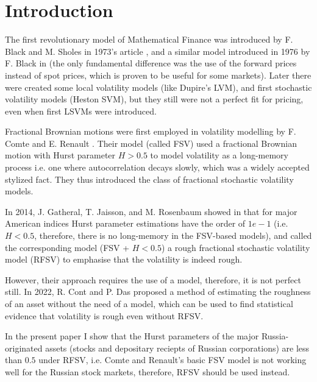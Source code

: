 \section{Introduction}
    The first revolutionary model of Mathematical Finance was introduced by F. Black and
    M. Sholes in 1973's article \cite{BlackSholes1973}, and a similar model introduced in
    1976 by F. Black in \cite{Black1976} (the only fundamental difference was the use of 
    the forward prices instead of spot prices, which is proven to be useful for some markets). 
    Later there were created some local volatility models (like Dupire's LVM), and first 
    stochastic volatility models (Heston SVM), but they still were not a perfect fit for pricing, 
    even when first LSVMs were introduced.

    Fractional Brownian motions were first employed in volatility modelling by F. Comte and 
    E. Renault \cite{ComteRenault1998}. Their model (called FSV) used a fractional Brownian 
    motion with Hurst parameter $H > 0.5$ to model volatility as a long-memory process i.e. 
    one where autocorrelation decays slowly, which was a widely accepted stylized fact. They 
    thus introduced the class of fractional stochastic volatility models.

    In 2014, J. Gatheral, T. Jaisson, and M. Rosenbaum showed in \cite{GatheralRosenbaum2014} 
    that for major American indices Hurst parameter estimations have the order of $1e-1$ 
    (i.e. $H < 0.5$, therefore, there is no long-memory in the FSV-based models), and called 
    the corresponding model (FSV + $H < 0.5$) a rough fractional stochastic volatility model 
    (RFSV) to emphasise that the volatility is indeed rough.

    However, their approach requires the use of a model, therefore, it is not perfect still.
    In 2022, R. Cont and P. Das \cite{Cont2022} proposed a method of estimating the roughness of 
    an asset without the need of a model, which can be used to find statistical evidence that
    volatility is rough even without RFSV.

    In the present paper I show that the Hurst parameters of the major Russia-originated 
    assets (stocks and depositary reciepts of Russian corporations) are less than $0.5$ under RFSV, 
    i.e. Comte and Renault's basic FSV model is not working well for the Russian stock markets, 
    therefore, RFSV should be used instead.